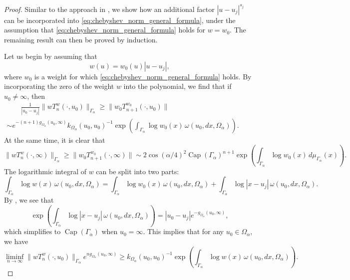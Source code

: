 \documentclass[12pt,oneside,reqno]{amsart}
\theoremstyle{definition}
\numberwithin{equation}{section}
\renewcommand{\Cap}{\operatorname{Cap}}
\begin{document}
\begin{proof}
	Similar to the approach in \cite{bernstein31}, we show how an additional factor $|u-u_j|^{s_j}$ can be incorporated into \eqref{eq:chebyshev_norm_general_formula}, under the assumption that \eqref{eq:chebyshev_norm_general_formula} holds for $w = w_0$. The remaining result can then be proved by induction. 
	
Let us begin by assuming that 
	\begin{equation}
	w(u) = w_0(u)|u-u_j|,
	\end{equation}
	where $w_0$ is a weight for which \eqref{eq:chebyshev_norm_general_formula} holds. 
	By incorporating the zero of the weight $w$ into the polynomial, we find that if $u_0\neq \infty$, then
	\begin{multline*}
		\qquad \frac{1}{|u_0-u_j|}\|w T_n^{w}(\cdot,u_0)\|_{\Gamma_\alpha}\geq \|w_0 T_{n+1}^{w_0}(\cdot,u_0)\| \\ \sim e^{-(n+1)g_{\Omega_\alpha}(u_0,\infty)}k_{\Omega_\alpha}(u_0,u_0)^{-1}\exp\left(\int_{\Gamma_\alpha} \log w_0(x)\,\omega(u_0,dx,\Omega_{\alpha})\right). \qquad
	\end{multline*}
	At the same time, it is clear that
	\[
		\|w T_n^{w}(\cdot,\infty)\|_{\Gamma_\alpha}\geq \|w_0 T_{n+1}^{w_0}(\cdot,\infty)\| \sim 2\cos(\alpha/4)^2\Cap(\Gamma_\alpha)^{n+1}\exp\left(\int_{\Gamma_\alpha} \log w_0(x)\,d\mu_{\Gamma_\alpha}(x)\right).
	\]
	The logarithmic integral of $w$ can be split into two parts:
	\[\int_{\Gamma_\alpha}\log w(x)\,\omega(u_0,dx,\Omega_\alpha) = \int_{\Gamma_\alpha}\log w_0(x)\,\omega(u_0,dx,\Omega_\alpha) +\int_{\Gamma_\alpha}\log |x-u_j|\,\omega(u_0,dx,\Omega_\alpha).\]
    By \cite[Sect.II.4]{ST97}, we see that
	\begin{equation}
		\exp\left(\int_{\Gamma_\alpha}\log |x-u_j|\,\omega(u_0,dx,\Omega_{\alpha})\right) = 
		|u_0-u_j| e^{-g_{\Omega_\alpha}(u_0,\infty)},
		\label{eq:frostman_theorem}
	\end{equation}
	which simplifies to $\Cap(\Gamma_\alpha)$ when $u_0=\infty$. This implies that for any $u_0\in \Omega_\alpha$, we have
	\begin{equation}
		\liminf_{n\rightarrow \infty} 
		\|w T_n^{w}(\cdot,u_0)\|_{\Gamma_{\alpha}}e^{ng_{\Omega_\alpha}(u_0,\infty)}
		\geq k_{\Omega_\alpha}(u_0,u_0)^{-1}
		\exp\left(\int_{\Gamma_\alpha} \log w(x)\,\omega(u_0,dx,\Omega_{\alpha})\right).

\end{equation}
\end{proof}
\end{document}
